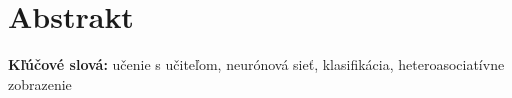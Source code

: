 
\section*{Abstrakt}


\begin{flushleft}
  \textbf{Kľúčové slová:} učenie s učiteľom, neurónová sieť, klasifikácia, heteroasociatívne zobrazenie
\end{flushleft}

